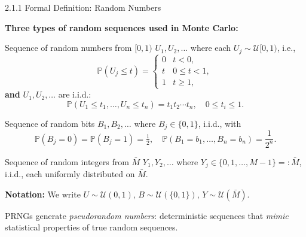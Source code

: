\documentclass[aspectratio=169,10pt]{beamer}
\begin{document}
\begin{frame}[allowframebreaks]{2.1.1 Formal Definition: Random Numbers}

\textbf{Three types of random sequences used in Monte Carlo:}

\medskip
\begin{block}{Sequence of random numbers from $[0,1)$}
$U_1, U_2, \ldots$ where each $U_j \sim \mathcal{U}[0,1)$, i.e.,
\[
  \mathbb{P}(U_j \le t) = \begin{cases} 0 & t < 0,\\ t & 0 \le t < 1,\\ 1 & t \ge 1,\end{cases}
\]
\textbf{and} $U_1, U_2, \ldots$ are i.i.d.:
\[
  \mathbb{P}(U_1 \le t_1, \ldots, U_n \le t_n) = t_1 t_2 \cdots t_n, \quad 0\le t_i\le 1.
\]
\end{block}

\framebreak

\begin{block}{Sequence of random bits}
$B_1, B_2, \ldots$ where $B_j \in \{0,1\}$, i.i.d., with
\[
  \mathbb{P}(B_j = 0) = \mathbb{P}(B_j = 1) = \tfrac{1}{2}, \quad
  \mathbb{P}(B_1=b_1,\ldots,B_n=b_n) = \frac{1}{2^n}.
\]
\end{block}

\begin{block}{Sequence of random integers from $\bar{M}$}
$Y_1, Y_2, \ldots$ where $Y_j \in \{0,1,\ldots,M-1\} =: \bar{M}$, i.i.d.,
each uniformly distributed on $\bar{M}$.
\end{block}

\medskip
\textbf{Notation:} We write $U \sim \mathcal{U}(0,1)$, $B \sim \mathcal{U}(\{0,1\})$,
$Y \sim \mathcal{U}(\bar{M})$.

\medskip
PRNGs generate \emph{pseudorandom numbers}: deterministic sequences that
\emph{mimic} statistical properties of true random sequences.

\end{frame}
\end{document}
